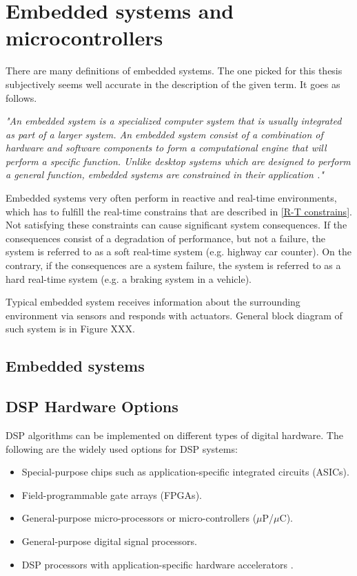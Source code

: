 \documentclass[twoside]{ctuthesis}
\theoremstyle{plain}
\theoremstyle{definition}
\theoremstyle{note}
\begin{document}
\section{Embedded systems and microcontrollers}
There are many definitions of embedded systems. The one picked for this thesis subjectively seems well accurate in the description of the given term. It goes as follows.

\textit{"An embedded system is a specialized computer system that is usually integrated as part of a larger system. An embedded system consist of a combination of hardware and software components to form a computational engine that will perform a specific function. Unlike desktop systems which are designed to perform a general function, embedded systems are constrained in their application \cite{cite:SE_for_ES}."}

Embedded systems very often perform in reactive and real-time environments, which has to fulfill the real-time constrains that are described in \ref{R-T constrains}. Not satisfying these constraints can cause significant system consequences. If the consequences consist of a degradation of performance, but not a failure, the system is referred to as a soft real-time system (e.g. highway car counter). On the contrary, if the consequences are a system failure, the system is referred to as a hard real-time system (e.g. a braking system in a vehicle). 

Typical embedded system receives information about the surrounding environment via sensors and responds with actuators. General block diagram of such system is in Figure XXX.																	
\subsection{Embedded systems}

\subsection{DSP Hardware Options}
DSP algorithms can be implemented on different types of digital hardware. The following are the widely used options for DSP systems:
\begin{itemize}
	\setlength{\itemsep}{5pt}
\item Special-purpose chips such as application-specific integrated circuits (ASICs).
\item Field-programmable gate arrays (FPGAs).
\item General-purpose micro-processors or micro-controllers ($\mu$P/$\mu$C).
\item General-purpose digital signal processors.
\item DSP processors with application-specific hardware accelerators \cite{cite:RT_DSP}.
\end{itemize}
\end{document}
